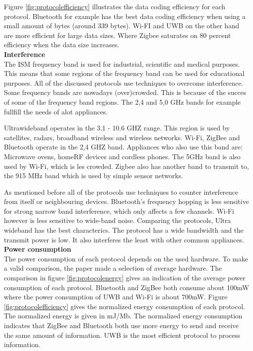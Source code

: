 \documentclass[10pt,a4paper]{article}
\begin{document}
Figure \ref{fig:protocolefficiency} illustrates the data coding efficiency for each protocol. Bluetooth for example has the best data coding efficiency when using a small amount of bytes (around 339 bytes). Wi-FI and UWB on the other hand are more efficient for large data sizes. Where Zigbee saturates on 80 percent efficiency when the data size increases.\\

\textbf{Interference}\\
The ISM frequency band is used for industrial, scientific and medical purposes. This means that some regions of the frequency band can be used for educational purposes. All of the discussed protocols use techniques to overcome interference. Some frequency bands are nowadays (over)crowded. This is because of the succes of some of the frequency band regions. \cite{Bluetoothwifisurveyandcomparison} The 2,4 and 5,0 GHz bands for example fullfill the needs of alot appliances.

Ultrawideband operates in the 3.1 - 10.6 GHZ range. This region is used by satellites, radars, broadband wireless and wireless networks. Wi-Fi, ZigBee and Bluetooth operate in the 2,4 GHZ band. Appliances who also use this band are: Microwave ovens, homeRF devices and cordless phones. The 5GHz band is also used by Wi-Fi, which is les crowded. Zigbee also has another band to transmit to, the 915 MHz band which is used by simple sensor networks.

As mentioned before all of the protocols use techniques to counter interference from itself or neighbouring devices. Bluetooth's frequency hopping is less sensitive for strong narrow band interference, which only affects a few channels. Wi-Fi however is less sensitive to wide-band noise. \cite{Bluetoothwifisurveyandcomparison} Comparing the protocols, Ultra wideband has the best characterics. The protocol has a wide bandwidth and the transmit power is low. It also interferes the least with other common appliances.\\

\textbf{Power consumption}\\
The power consumption of each protocol depends on the used hardware. To make a valid comparison, the paper \cite{comparitivestudywirelessprotocols} made a selection of average hardware. The comparison in figure \ref{fig:protocolenergy} gives an indication of the average power consumption of each protocol. Bluetooth and ZigBee both consume about 100mW where the power consumption of UWB and Wi-Fi is about 700mW. Figure \ref{fig:protocolefficiency} gives the normalized energy consumption of each protocol. The normalized energy is given in mJ/Mb. The normalized energy consumption indicates that ZigBee and Bluetooth both use more energy to send and receive the same amount of information. UWB is the most efficient protocol to process information.
\end{document}
